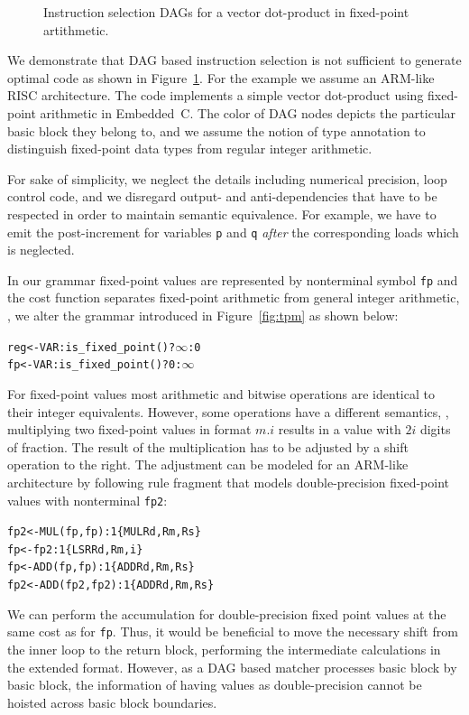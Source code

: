\begin{figure}[ht]
\begin{center}
  \end{center}
  \caption{Instruction selection DAGs for a vector dot-product in
    fixed-point artithmetic.}\label{fig:dot_product}
\end{figure}

We demonstrate that DAG based instruction selection is not
sufficient to generate optimal code as shown in
Figure~\ref{fig:dot_product}. For the example we assume an ARM-like RISC
architecture. The code implements a simple vector dot-product using
fixed-point arithmetic in Embedded~C. The color of DAG nodes depicts
the particular basic block they belong to, and we assume the notion of type
annotation to distinguish fixed-point data types from
regular integer arithmetic.

For sake of simplicity, we neglect the details including numerical precision,
loop control code, and we disregard output- and anti-dependencies
that have to be respected in order to maintain semantic equivalence.
For example, we have to emit the
post-increment for variables \texttt{p} and \texttt{q} \emph{after} the
corresponding loads which is neglected.

In our grammar fixed-point values are represented by
nonterminal symbol \texttt{fp} and the cost function
separates fixed-point arithmetic from general integer arithmetic,
\ie, we alter the grammar introduced in Figure~\ref{fig:tpm} as
shown below:
\begin{alltt}
   reg <- VAR : is\_fixed_point() ? \(\infty\) : 0
   fp  <- VAR : is\_fixed_point() ? 0 : \(\infty\)
\end{alltt}
For fixed-point values most arithmetic and bitwise operations are
identical to their integer equivalents. However, some operations have
a different semantics, \eg, multiplying two fixed-point values in
format $m.i$ results in a value with $2i$ digits of fraction. The
result of the multiplication has to be adjusted by a shift operation
to the right. The adjustment can be modeled for an ARM-like
architecture by following rule fragment that models double-precision
fixed-point values with nonterminal \texttt{fp2}:
\begin{alltt}
   fp2 <- MUL(fp, fp)   : 1   \{ MUL Rd, Rm, Rs \}
   fp  <- fp2           : 1   \{ LSR Rd, Rm, i  \}
   fp  <- ADD(fp, fp)   : 1   \{ ADD Rd, Rm, Rs \}
   fp2 <- ADD(fp2, fp2) : 1   \{ ADD Rd, Rm, Rs \}
\end{alltt}
We can perform the accumulation for double-precision fixed
point values at the same cost as for \texttt{fp}. Thus, it would be
beneficial to move the necessary shift from the inner loop to the
return block, performing the intermediate calculations in the extended
format. However, as a DAG based matcher processes basic block by
basic block, the information of having values as double-precision
cannot be hoisted across basic block boundaries.

